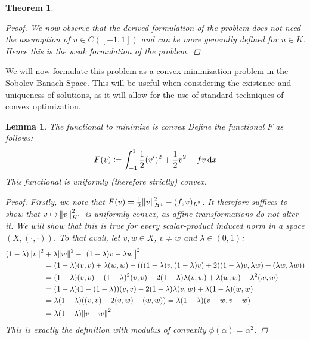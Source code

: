 \documentclass[headsepline,footsepline,footinclude=false,oneside,fontsize=11pt,paper=a4,listof=totoc,bibliography=totoc]{scrbook} %
\newtheorem{lemma}{Lemma}
\newtheorem{theorem}{Theorem}
\begin{document}
\begin{theorem}
\begin{proof}
	We now observe that the derived formulation of the problem does not need the assumption of $u \in C([-1,1])$ and can be more generally defined for $u \in K$. Hence this is the weak formulation of the problem.
	
	\end{proof}
\end{theorem}

We will now formulate this problem as a convex minimization problem in the Sobolev Banach Space. This will be useful when considering the existence and uniqueness of solutions, as it will allow for the use of standard techniques of convex optimization.

\begin{lemma} The functional to minimize is convex \newline
	Define the functional $F$ as follows:
	\begin{equation}
			F(v) \coloneqq \int_{-1}^1{\frac{1}{2} (v')^2 + \frac{1}{2} v^2 - fv \dif x}
	\end{equation}
	This functional is uniformly (therefore strictly) convex.
	\begin{proof}
		Firstly, we note that $F(v) = \frac{1}{2} \norm{v}_{H^1}^2 - (f,v)_{L^2} $. It therefore suffices to show that $v \mapsto \norm{v}_{H^1}^2$ is uniformly convex, as affine transformations do not alter it. We will show that this is true for every scalar-product induced norm in a space $(X, (\cdot,\cdot))$. To that avail, let $v,w \in X$, $v \neq w$ and $\lambda \in (0,1)$:
		\begin{align*}
		(1-\lambda)\norm{v}^2 &+ \lambda\norm{w}^2 - \norm{(1-\lambda)v - \lambda w}^2 \\
		& = (1-\lambda) (v,v) + \lambda (w,w) - (((1-\lambda)v,(1-\lambda)v) + 2((1-\lambda)v, \lambda w)+ (\lambda w, \lambda w)) \\
		&= (1-\lambda) (v,v) - (1-\lambda)^2 (v,v) - 2 (1-\lambda)\lambda(v,w) + \lambda (w,w) - \lambda^2 (w,w) \\
		&= (1-\lambda)(1-(1-\lambda))(v,v)- 2 (1-\lambda)\lambda(v,w) + \lambda (1-\lambda)(w,w) \\
		&= \lambda(1- \lambda)((v,v) - 2(v,w)+(w,w)) = \lambda(1-\lambda)(v-w,v-w) \\
		&= \lambda(1-\lambda)\norm{v-w}^2
		\end{align*}
		This is exactly the definition with modulus of convexity $\phi(\alpha) = \alpha ^2$.
	\end{proof}
\end{lemma}
\end{document}
